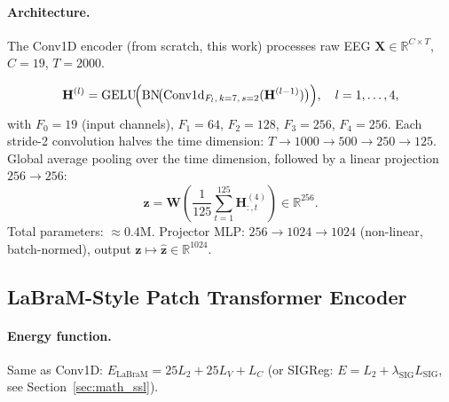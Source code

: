 \documentclass[11pt,a4paper]{article}
\begin{document}
\paragraph{Architecture.}
The Conv1D encoder (from scratch, this work) processes raw EEG
$\mathbf{X} \in \mathbb{R}^{C \times T}$, $C{=}19$, $T{=}2000$.

\begin{equation}
  \mathbf{H}^{(l)} = \mathrm{GELU}\!\Bigl(\mathrm{BN}\!\bigl(
    \mathrm{Conv1d}_{F_l,\, k=7,\, s=2}(\mathbf{H}^{(l-1)})\bigr)\Bigr),
  \quad l = 1,\ldots,4,
\end{equation}
with $F_0 = 19$ (input channels), $F_1 = 64$, $F_2 = 128$, $F_3 = 256$,
$F_4 = 256$.  Each stride-2 convolution halves the time dimension:
$T \to 1000 \to 500 \to 250 \to 125$.  Global average pooling over the time
dimension, followed by a linear projection $256 \to 256$:
\begin{equation}
  \mathbf{z} = \mathbf{W}\! \left(\frac{1}{125} \sum_{t=1}^{125}
    \mathbf{H}^{(4)}_{:,t}\right) \in \mathbb{R}^{256}.
\end{equation}
Total parameters: $\approx 0.4$M.
Projector MLP: $256 \to 1024 \to 1024$ (non-linear, batch-normed), output
$\mathbf{z} \mapsto \hat{\mathbf{z}} \in \mathbb{R}^{1024}$.

\subsection{LaBraM-Style Patch Transformer Encoder}
\label{sec:math_labram}

\paragraph{Energy function.}
Same as Conv1D: $E_{\mathrm{LaBraM}} = 25 L_2 + 25 L_V + L_C$
(or SIGReg: $E = L_2 + \lambda_{\mathrm{SIG}} L_{\mathrm{SIG}}$, see
Section~\ref{sec:math_ssl}).
\end{document}
